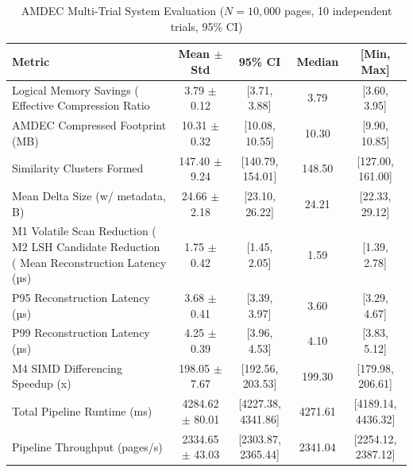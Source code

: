 \begin{table}[t]
\centering
\caption{AMDEC Multi-Trial System Evaluation ($N=10,000$ pages, 10 independent trials, 95\% CI)}
\label{tab:amdec_evaluation}
\small
\begin{tabular}{lcccc}
\hline
\textbf{Metric} & \textbf{Mean $\pm$ Std} & \textbf{95\% CI} & \textbf{Median} & \textbf{[Min, Max]} \\
\hline
Logical Memory Savings (%
Effective Compression Ratio & 3.79 $\pm$ 0.12 & [3.71, 3.88] & 3.79 & [3.60, 3.95] \\
AMDEC Compressed Footprint (MB) & 10.31 $\pm$ 0.32 & [10.08, 10.55] & 10.30 & [9.90, 10.85] \\
Similarity Clusters Formed & 147.40 $\pm$ 9.24 & [140.79, 154.01] & 148.50 & [127.00, 161.00] \\
Mean Delta Size (w/ metadata, B) & 24.66 $\pm$ 2.18 & [23.10, 26.22] & 24.21 & [22.33, 29.12] \\
M1 Volatile Scan Reduction (%
M2 LSH Candidate Reduction (%
Mean Reconstruction Latency (µs) & 1.75 $\pm$ 0.42 & [1.45, 2.05] & 1.59 & [1.39, 2.78] \\
P95 Reconstruction Latency (µs) & 3.68 $\pm$ 0.41 & [3.39, 3.97] & 3.60 & [3.29, 4.67] \\
P99 Reconstruction Latency (µs) & 4.25 $\pm$ 0.39 & [3.96, 4.53] & 4.10 & [3.83, 5.12] \\
M4 SIMD Differencing Speedup (x) & 198.05 $\pm$ 7.67 & [192.56, 203.53] & 199.30 & [179.98, 206.61] \\
Total Pipeline Runtime (ms) & 4284.62 $\pm$ 80.01 & [4227.38, 4341.86] & 4271.61 & [4189.14, 4436.32] \\
Pipeline Throughput (pages/s) & 2334.65 $\pm$ 43.03 & [2303.87, 2365.44] & 2341.04 & [2254.12, 2387.12] \\
\hline
\end{tabular}
\end{table}